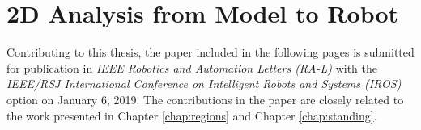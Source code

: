 %
\chapter{2D Analysis from Model to Robot}
Contributing to this thesis, the paper included in the following pages is submitted for publication in \textit{IEEE Robotics and Automation Letters (RA-L)} with the \textit{IEEE/RSJ International Conference on Intelligent Robots and Systems (IROS)} option on January 6, 2019. The contributions in the paper are closely related to the work presented in Chapter \ref{chap:regions} and Chapter \ref{chap:standing}.



